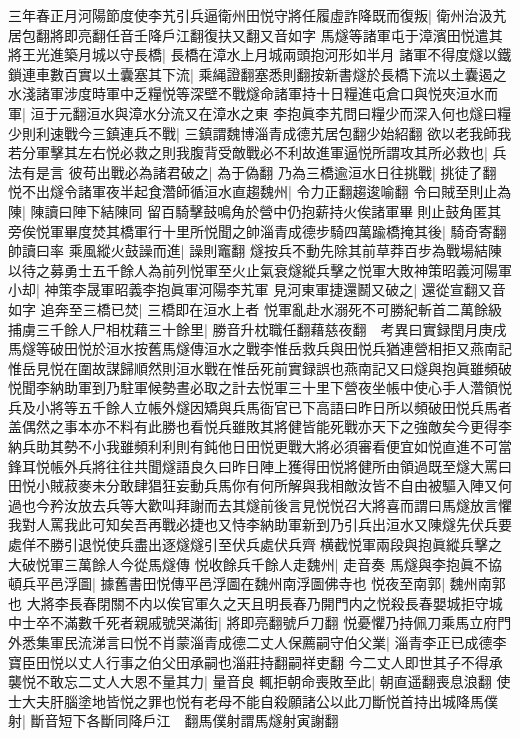 三年春正月河陽節度使李艽引兵逼衛州田悦守將任履虛詐降既而復叛|{
	衛州治汲艽居包翻將即亮翻任音壬降戶江翻復扶又翻又音如字}
馬燧等諸軍屯于漳濱田悦遣其將王光進築月城以守長橋|{
	長橋在漳水上月城兩頭抱河形如半月}
諸軍不得度燧以鐵鎖連車數百實以土囊塞其下流|{
	乘䋲證翻塞悉則翻按新書燧於長橋下流以土囊遏之}
水淺諸軍涉度時軍中乏糧悦等深壁不戰燧命諸軍持十日糧進屯倉口與悦夾洹水而軍|{
	洹于元翻洹水與漳水分流又在漳水之東}
李抱眞李艽問曰糧少而深入何也燧曰糧少則利速戰今三鎮連兵不戰|{
	三鎮謂魏博淄青成德艽居包翻少始紹翻}
欲以老我師我若分軍擊其左右悦必救之則我腹背受敵戰必不利故進軍逼悦所謂攻其所必救也|{
	兵法有是言}
彼苟出戰必為諸君破之|{
	為于偽翻}
乃為三橋逾洹水日往挑戰|{
	挑徒了翻}
悦不出燧令諸軍夜半起食濳師循洹水直趨魏州|{
	令力正翻趨逡喻翻}
令曰賊至則止為陳|{
	陳讀曰陣下結陳同}
留百騎擊鼓鳴角於營中仍抱薪持火俟諸軍畢則止鼓角匿其旁俟悦軍畢度焚其橋軍行十里所悦聞之帥淄青成德步騎四萬踰橋掩其後|{
	騎奇寄翻帥讀曰率}
乘風縱火鼓譟而進|{
	譟則竈翻}
燧按兵不動先除其前草莽百步為戰場結陳以待之募勇士五千餘人為前列悦軍至火止氣衰燧縱兵擊之悦軍大敗神策昭義河陽軍小却|{
	神策李晟軍昭義李抱眞軍河陽李艽軍}
見河東軍捷還鬭又破之|{
	還從宣翻又音如字}
追奔至三橋已焚|{
	三橋即在洹水上者}
悦軍亂赴水溺死不可勝紀斬首二萬餘級捕虜三千餘人尸相枕藉三十餘里|{
	勝音升枕職任翻藉慈夜翻　考異曰實録閏月庚戌馬燧等破田悦於洹水按舊馬燧傳洹水之戰李惟岳救兵與田悦兵猶連營相拒又燕南記惟岳見悦在圍故謀歸順然則洹水戰在惟岳死前實録誤也燕南記又曰燧與抱眞雖頻破悦聞李納助軍到乃駐軍候勢晝必取之計去悦軍三十里下營夜坐帳中使心手人濳領悦兵及小將等五千餘人立帳外燧因矯與兵馬衙官已下高語曰昨日所以頻破田悦兵馬者盖偶然之事本亦不料有此勝也看悦兵雖敗其將健皆能死戰亦天下之強敵矣今更得李納兵助其勢不小我雖頻利利則有鈍他日田悦更戰大將必須審看便宜如悦直進不可當鋒耳悦帳外兵將往往共聞燧語良久曰昨日陣上獲得田悦將健所由領過既至燧大罵曰田悦小賊菽麥未分敢肆猖狂妄動兵馬你有何所解與我相敵汝皆不自由被驅入陣又何過也今矜汝放去兵等大歡叫拜謝而去其燧前後言見悦悦召大將喜而謂曰馬燧放言懼我對人罵我此可知矣吾再戰必捷也又恃李納助軍新到乃引兵出洹水又陳燧先伏兵要處佯不勝引退悦使兵盡出逐燧燧引至伏兵處伏兵齊横截悦軍兩段與抱眞縱兵擊之大破悦軍三萬餘人今從馬燧傳}
悦收餘兵千餘人走魏州|{
	走音奏}
馬燧與李抱眞不協頓兵平邑浮圖|{
	據舊書田悦傳平邑浮圖在魏州南浮圖佛寺也}
悦夜至南郭|{
	魏州南郭也}
大將李長春閉關不内以俟官軍久之天且明長春乃開門内之悦殺長春嬰城拒守城中士卒不滿數千死者親戚號哭滿街|{
	將即亮翻號戶刀翻}
悦憂懼乃持佩刀乘馬立府門外悉集軍民流涕言曰悦不肖蒙淄青成德二丈人保薦嗣守伯父業|{
	淄青李正已成德李寶臣田悦以丈人行事之伯父田承嗣也淄莊持翻嗣祥吏翻}
今二丈人即世其子不得承襲悦不敢忘二丈人大恩不量其力|{
	量音良}
輒拒朝命喪敗至此|{
	朝直遥翻喪息浪翻}
使士大夫肝腦塗地皆悦之罪也悦有老母不能自殺願諸公以此刀斷悦首持出城降馬僕射|{
	斷音短下各斷同降戶江　翻馬僕射謂馬燧射寅謝翻}
